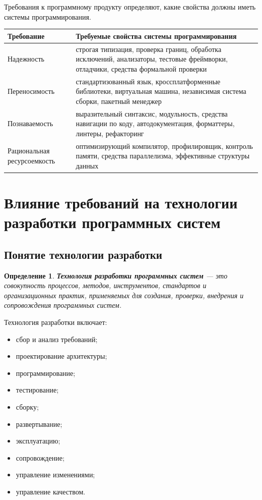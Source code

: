 \documentclass[12pt,a4paper]{article}
\newtheorem{definition}{Определение}
\begin{document}
Требования к программному продукту определяют, какие свойства должны иметь системы программирования.

\begin{longtable}{p{} p{}}
\toprule
\textbf{Требование} & \textbf{Требуемые свойства системы программирования} \\
\midrule
Надежность & строгая типизация, проверка границ, обработка исключений, анализаторы, тестовые фреймворки, отладчики, средства формальной проверки \\
\midrule
Переносимость & стандартизованный язык, кроссплатформенные библиотеки, виртуальная машина, независимая система сборки, пакетный менеджер \\
\midrule
Познаваемость & выразительный синтаксис, модульность, средства навигации по коду, автодокументация, форматтеры, линтеры, рефакторинг \\
\midrule
Рациональная ресурсоемкость & оптимизирующий компилятор, профилировщик, контроль памяти, средства параллелизма, эффективные структуры данных \\
\bottomrule
\end{longtable}

\section{Влияние требований на технологии разработки программных систем}

\subsection{Понятие технологии разработки}

\begin{definition}
\textbf{Технология разработки программных систем} --- это совокупность процессов, методов, инструментов, стандартов и организационных практик, применяемых для создания, проверки, внедрения и сопровождения программных систем.
\end{definition}

Технология разработки включает:
\begin{itemize}
    \item сбор и анализ требований;
    \item проектирование архитектуры;
    \item программирование;
    \item тестирование;
    \item сборку;
    \item развертывание;
    \item эксплуатацию;
    \item сопровождение;
    \item управление изменениями;
    \item управление качеством.
\end{itemize}
\end{document}
